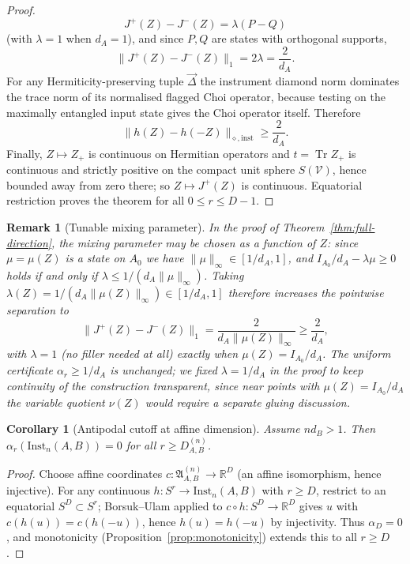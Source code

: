 \documentclass[11pt,a4paper]{article}
\newtheorem{corollary}[theorem]{Corollary}
\newtheorem{remark}[theorem]{Remark}
\newcommand{\Inst}{\mathrm{Inst}}
\newcommand{\Tr}{\operatorname{Tr}}
\newcommand{\vD}{\vec{\Delta}}
\begin{document}
\begin{proof}
\[
J^+(Z)-J^-(Z)=\lambda(P-Q)
\]
(with $\lambda=1$ when $d_A=1$), and since $P,Q$ are states with orthogonal supports,
\[
\|J^+(Z)-J^-(Z)\|_1=2\lambda=\frac2{d_A}.
\]
For any Hermiticity-preserving tuple $\vD$ the instrument diamond norm dominates the trace norm of its normalised flagged Choi operator, because testing on the maximally entangled input state gives the Choi operator itself. Therefore
\[
\|h(Z)-h(-Z)\|_{\diamond,\mathrm{inst}}\ge\frac2{d_A}.
\]
Finally, $Z\mapsto Z_+$ is continuous on Hermitian operators and $t=\Tr Z_+$ is continuous and strictly positive on the compact unit sphere $S(\mathcal V)$, hence bounded away from zero there; so $Z\mapsto J^+(Z)$ is continuous. Equatorial restriction proves the theorem for all $0\le r\le D-1$.
\end{proof}

\begin{remark}[Tunable mixing parameter]
\label{rem:tunable-lambda}
In the proof of Theorem~\ref{thm:full-direction}, the mixing parameter may be chosen as a function of $Z$: since $\mu=\mu(Z)$ is a state on $A_0$ we have $\|\mu\|_\infty\in[1/d_A,1]$, and $I_{A_0}/d_A-\lambda\mu\ge0$ holds if and only if $\lambda\le1/(d_A\|\mu\|_\infty)$. Taking $\lambda(Z)=1/(d_A\|\mu(Z)\|_\infty)\in[1/d_A,1]$ therefore increases the pointwise separation to
\[
\|J^+(Z)-J^-(Z)\|_1=\frac{2}{d_A\|\mu(Z)\|_\infty}\ge\frac2{d_A},
\]
with $\lambda=1$ (no filler needed at all) exactly when $\mu(Z)=I_{A_0}/d_A$. The uniform certificate $\alpha_r\ge1/d_A$ is unchanged; we fixed $\lambda=1/d_A$ in the proof to keep continuity of the construction transparent, since near points with $\mu(Z)=I_{A_0}/d_A$ the variable quotient $\nu(Z)$ would require a separate gluing discussion.
\end{remark}

\begin{corollary}[Antipodal cutoff at affine dimension]
\label{cor:cutoff}
Assume $nd_B>1$. Then $\alpha_r(\Inst_n(A,B))=0$ for all $r\ge D_{A,B}^{(n)}$.
\end{corollary}

\begin{proof}
Choose affine coordinates $c:\mathfrak A_{A,B}^{(n)}\to\mathbb R^{D}$ (an affine isomorphism, hence injective). For any continuous $h:S^r\to\Inst_n(A,B)$ with $r\ge D$, restrict to an equatorial $S^D\subset S^r$; Borsuk--Ulam applied to $c\circ h:S^D\to\mathbb R^D$ gives $u$ with $c(h(u))=c(h(-u))$, hence $h(u)=h(-u)$ by injectivity. Thus $\alpha_D=0$, and monotonicity (Proposition~\ref{prop:monotonicity}) extends this to all $r\ge D$.
\end{proof}
\end{document}

